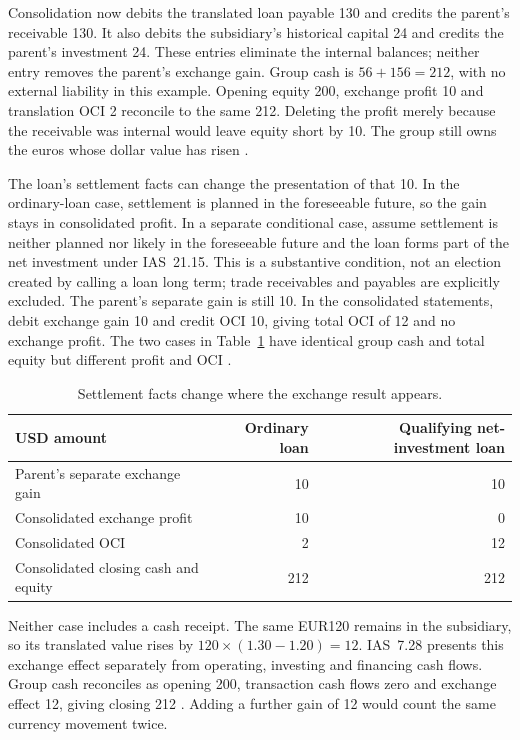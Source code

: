 Consolidation now debits the translated loan payable 130 and credits the
parent's receivable 130. It also debits the subsidiary's historical capital
24 and credits the parent's investment 24. These entries eliminate the
internal balances; neither entry removes the parent's exchange gain. Group
cash is $56+156=212$, with no external liability in this example. Opening
equity 200, exchange profit 10 and translation OCI 2 reconcile to the same
212. Deleting the profit merely because the receivable was internal would
leave equity short by 10. The group still owns the euros whose dollar value
has risen \citep[IFRS~10.B86; IAS~21.45]{eu20231803}.

\clearpage
The loan's settlement facts can change the presentation of that 10.
In the ordinary-loan case, settlement is planned in the foreseeable future,
so the gain stays in consolidated profit. In a separate conditional case,
assume settlement is neither planned nor likely in the foreseeable future
and the loan forms part of the net investment under IAS~21.15. This is a
substantive condition, not an election created by calling a loan long term;
trade receivables and payables are explicitly excluded. The parent's separate
gain is still 10. In the consolidated statements, debit exchange gain 10
and credit OCI 10, giving total OCI of 12 and no exchange profit. The two
cases in Table~\ref{tab:intragroup-fx} have identical group cash and total
equity but different profit and OCI
\citep[IAS~21.15, .32--33]{eu20231803}.

\begin{table}[!ht]
\centering
\caption{Settlement facts change where the exchange result appears.}
\label{tab:intragroup-fx}
\begin{tabular}{@{}lrr@{}}
\toprule
USD amount & Ordinary loan & Qualifying net-investment loan \\
\midrule
Parent's separate exchange gain & 10 & 10 \\
Consolidated exchange profit & 10 & 0 \\
Consolidated OCI & 2 & 12 \\
Consolidated closing cash and equity & 212 & 212 \\
\bottomrule
\end{tabular}
\end{table}

Neither case includes a cash receipt. The same EUR120 remains in the
subsidiary, so its translated value rises by
$120\times(1.30-1.20)=12$. IAS~7.28 presents this exchange effect separately
from operating, investing and financing cash flows. Group cash reconciles
as opening 200, transaction cash flows zero and exchange effect 12, giving
closing 212 \citep[IAS~7.25--28]{eu20231803}. Adding a further gain of 12
would count the same currency movement twice.

